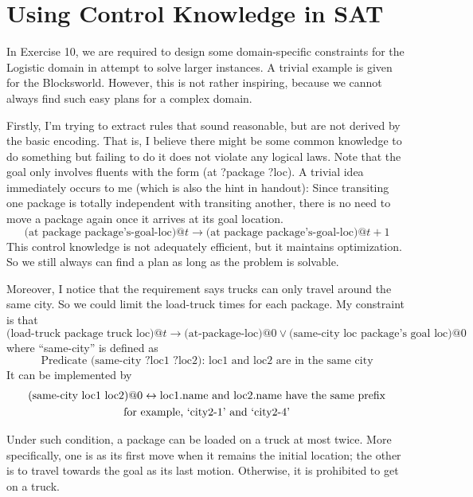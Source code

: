 \documentclass{article}
\begin{document}
\section{Using Control Knowledge in SAT}
In Exercise 10, we are required to design some domain-specific constraints for the Logistic domain in attempt to solve larger instances. A trivial example is given for the Blocksworld. However, this is not rather inspiring, because we cannot always find such easy plans for a complex domain.

Firstly, I'm trying to extract rules that sound reasonable, but are not derived by the basic encoding. That is, I believe there might be some common knowledge to do something but failing to do it does not violate any logical laws. Note that the goal only involves fluents with the form (at ?package ?loc). A trivial idea immediately occurs to me (which is also the hint in handout): Since transiting one package is totally independent with transiting another, there is no need to move a package again once it arrives at its goal location.
\begin{equation}
\text{(at package package's-goal-loc)}@t \to \text{(at package package's-goal-loc)}@t\!+\!1
\end{equation}
This control knowledge is not adequately efficient, but it maintains optimization. So we still always can find a plan as long as the problem is solvable.

Moreover, I notice that the requirement says trucks can only travel around the same city. So we could limit the load-truck times for each package. My constraint is that
\begin{equation}
\text{(load-truck package truck loc)}@t \to \text{(at-package-loc)}@0 \lor \text{(same-city loc package's goal loc)}@0
\end{equation}
where ``same-city'' is defined as
\begin{equation}
\text{Predicate (same-city ?loc1 ?loc2): loc1 and loc2 are in the same city}
\end{equation}
It can be implemented by
\begin{gather}
\text{(same-city loc1 loc2)}@0 \leftrightarrow \text{loc1.name and loc2.name have the same prefix} \\
\text{for example, `city2-1' and `city2-4'} \notag
\end{gather}

Under such condition, a package can be loaded on a truck at most twice. More specifically, one is as its first move when it remains the initial location; the other is to travel towards the goal as its last motion. Otherwise, it is prohibited to get on a truck.
\end{document}
